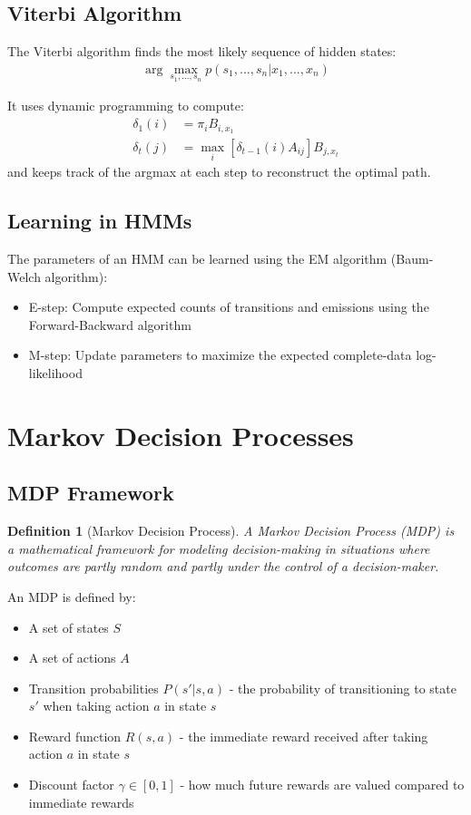 \documentclass{article}
\newtheorem{definition}{Definition}
\begin{document}
\subsection{Viterbi Algorithm}
The Viterbi algorithm finds the most likely sequence of hidden states:
\begin{align}
\arg\max_{s_1, \ldots, s_n} p(s_1, \ldots, s_n|x_1, \ldots, x_n)
\end{align}

It uses dynamic programming to compute:
\begin{align}
\delta_1(i) &= \pi_i B_{i,x_1}\\
\delta_t(j) &= \max_{i}[\delta_{t-1}(i)A_{ij}]B_{j,x_t}
\end{align}
and keeps track of the argmax at each step to reconstruct the optimal path.

\subsection{Learning in HMMs}
The parameters of an HMM can be learned using the EM algorithm (Baum-Welch algorithm):
\begin{itemize}
\item E-step: Compute expected counts of transitions and emissions using the Forward-Backward algorithm
\item M-step: Update parameters to maximize the expected complete-data log-likelihood
\end{itemize}

\section{Markov Decision Processes}

\subsection{MDP Framework}
\begin{definition}[Markov Decision Process]
A Markov Decision Process (MDP) is a mathematical framework for modeling decision-making in situations where outcomes are partly random and partly under the control of a decision-maker.
\end{definition}

An MDP is defined by:
\begin{itemize}
\item A set of states $S$
\item A set of actions $A$
\item Transition probabilities $P(s'|s, a)$ - the probability of transitioning to state $s'$ when taking action $a$ in state $s$
\item Reward function $R(s, a)$ - the immediate reward received after taking action $a$ in state $s$
\item Discount factor $\gamma \in [0, 1]$ - how much future rewards are valued compared to immediate rewards
\end{itemize}
\end{document}
